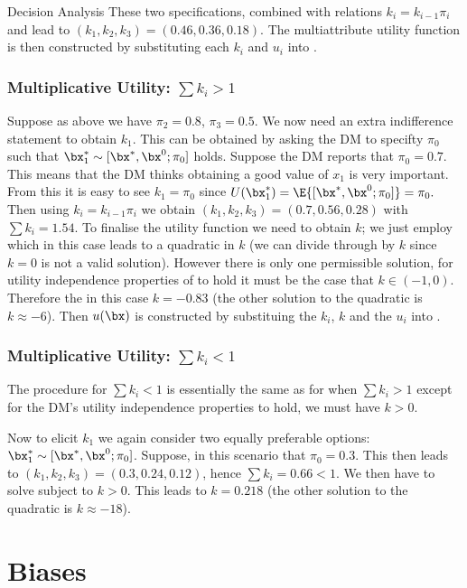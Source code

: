 \begin{chapter}{Decision Analysis \label{Ch:decision}}
These two specifications, combined with relations $k_i = k_{i-1}\pi_i$ and  lead to $(k_1, k_2, k_3) = (0.46, 0.36, 0.18)$. The multiattribute utility function is then constructed by substituting each $k_i$ and $u_i$ into .

\subsubsection{Multiplicative Utility: $\sum k_i > 1$}

Suppose as above we have $\pi_2 = 0.8$, $\pi_3 = 0.5$. We now need an extra indifference statement to obtain $k_1$. This can be obtained by asking the DM to specifty $\pi_0$ such that $\bx_1^* \sim [\bx^*, \bx^0; \pi_0]$ holds. Suppose the DM reports that $\pi_0 = 0.7$. This means that the DM thinks obtaining a good value of $x_1$ is very important. From this it is easy to see $k_1 = \pi_0$ since $U(\bx^*_1) = \E \{ [\bx^*, \bx^0; \pi_0] \} = \pi_0.$ Then using $k_i = k_{i-1} \pi_i$ we obtain $(k_1, k_2, k_3) = (0.7, 0.56, 0.28)$ with $\sum k_i = 1.54$. To finalise the utility function we need to obtain $k$; we just employ  which in this case leads to a quadratic in $k$ (we can divide through by $k$ since $k = 0$ is not a valid solution). However there is only one permissible solution, for utility independence properties of  to hold it must be the case that $k \in (-1, 0)$. Therefore the in this case $k = -0.83$ (the other solution to the quadratic is $k \approx -6$). Then $u(\bx)$ is constructed by substituing the $k_i$, $k$ and the $u_i$ into .

\subsubsection{Multiplicative Utility: $\sum k_i < 1$}

The procedure for $\sum k_i < 1$ is essentially the same as for when $\sum k_i > 1$ except for the DM's utility independence properties to hold, we must have $k>0$.

Now to elicit $k_1$ we again consider two equally preferable options: $\bx_1^* \sim [\bx^*, \bx^0; \pi_0]$. Suppose, in this scenario that $\pi_0 = 0.3$. This then leads to $(k_1, k_2, k_3) = (0.3, 0.24, 0.12)$, hence $\sum k_i = 0.66<1$. We then have to solve  subject to $k>0$. This leads to $k = 0.218$ (the other solution to the quadratic is $k \approx -18$).

\section{Biases}


\end{chapter}
